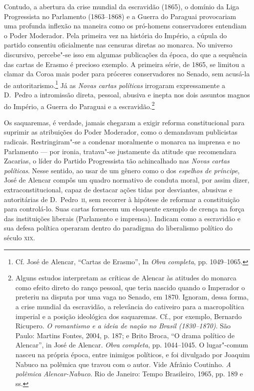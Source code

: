 Contudo, a abertura da crise mundial da escravidão (1865), o domínio da
Liga Progressista no Parlamento (1863--1868) e a Guerra do Paraguai
provocariam uma profunda inflexão na maneira como os pró-homens
conservadores entendiam o Poder Moderador. Pela primeira vez na
história do Império, a cúpula do partido consentiu oficialmente nas
censuras diretas ao monarca. No universo discursivo, percebe"-se isso em
algumas publicações da época, do que a sequência das cartas de Erasmo é
precioso exemplo. A primeira série, de 1865, se limitou a clamar da
Coroa mais poder para próceres conservadores no Senado, sem acusá-la de
autoritarismo.\footnote{ Cf. José de Alencar, “Cartas de Erasmo”, In
\textit{Obra completa}, pp. 1049--1065.}  Já as \textit{Novas
cartas políticas} irrogaram expressamente a D.~Pedro a intromissão
direta, pessoal, abusiva e inepta nos dois assuntos magnos do Império,
a Guerra do Paraguai e a escravidão.\footnote{ Alguns estudos
interpretam as críticas de Alencar às atitudes do monarca como efeito
direto do ranço pessoal, que teria nascido quando o Imperador o
preteriu na disputa por uma vaga no Senado, em 1870. Ignoram, dessa
forma, a crise mundial da escravidão, a relevância do cativeiro para a
macropolítica imperial e a posição ideológica dos saquaremas. Cf., por
exemplo, Bernardo Ricupero. \textit{O romantismo e a ideia de nação no
Brasil (1830--1870)}. São Paulo: Martins Fontes, 2004, p. 187; e Brito
Broca, “O drama político de Alencar”, in José de Alencar. \textit{Obra
completa}, pp. 1044--1045. O lugar"-comum nasceu na própria época, entre
inimigos políticos, e foi divulgado por Joaquim Nabuco na polêmica que
travou com o autor. Vide Afrânio Coutinho. \textit{A polêmica
Alencar-Nabuco}. Rio de Janeiro: Tempo Brasileiro, 1965, pp. 189 e ss.
}

Os saquaremas, é verdade, jamais chegaram a exigir reforma
constitucional para suprimir as atribuições do Poder Moderador, como o
demandavam publicistas radicais. Restringiram"-se a condenar moralmente
o monarca na imprensa e no Parlamento --- por ironia, tratava"-se
justamente da atitude que recomendara Zacarias, o líder do Partido
Progressista tão achincalhado nas \textit{Novas cartas políticas}.
Nesse sentido, ao usar de um gênero como o dos \textit{espelhos de príncipe}, José de Alencar
compôs um quadro normativo de conduta moral, por assim dizer,
extraconstitucional, capaz de destacar ações tidas por desviantes,
abusivas e autoritárias de D.~Pedro~\textsc{ii}, sem recorrer à  hipótese de
reformar a constituição para controlá-lo. Suas cartas fornecem um
eloquente exemplo de crença na força das instituições liberais
(Parlamento e imprensa). Indicam como a escravidão e sua defesa
política operaram dentro do paradigma do liberalismo político do século
\textsc{xix}. 

